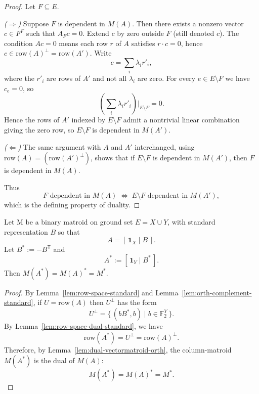 \begin{proof}
    Let $F \subseteq E$.  

    \emph{($\Rightarrow$)}  
    Suppose $F$ is dependent in $M(A)$.  
    Then there exists a nonzero vector $c \in F^{F}$ such that $A_F c = 0$.  
    Extend $c$ by zero outside $F$ (still denoted $c$).  
    The condition $A c = 0$ means each row $r$ of $A$ satisfies $r \cdot c = 0$,  
    hence $c \in \text{row}(A)^{\perp} = \text{row}(A')$.  
    Write
    \[
        c = \sum_i \lambda_i r'_i,
    \]
    where the $r'_i$ are rows of $A'$ and not all $\lambda_i$ are zero.  
    For every $e \in E\setminus F$ we have $c_e = 0$, so
    \[
        \left(\sum_i \lambda_i r'_i\right)\big|_{E\setminus F} = 0.
    \]
    Hence the rows of $A'$ indexed by $E \setminus F$ admit a nontrivial
    linear combination giving the zero row, so $E \setminus F$ is dependent in $M(A')$.

    \emph{($\Leftarrow$)}  
    The same argument with $A$ and $A'$ interchanged, using
    $\text{row}(A) = (\text{row}(A')^\perp)$, shows that if
    $E\setminus F$ is dependent in $M(A')$, then $F$ is dependent in $M(A)$.

    Thus
    \[
        F \text{ dependent in } M(A)
        \;\Longleftrightarrow\;
        E \setminus F \text{ dependent in } M(A'),
    \]
    which is the defining property of duality.
\end{proof}





\begin{theorem}
\label{thm:StandardRepr.toMatroid_dual}
Let M be a binary matroid on ground set $E = X \cup Y$, with
standard representation $B$ so that
\[A = [\, \mathbf{1}_X \mid B \,].\]
Let $B^{*} := -B^{\mathsf T}$ and
\[A^{*} := [\, \mathbf{1}_Y \mid B^{*} \,].\]
Then $M(A^{*}) = M(A)^{*} = M^{*}$.
\end{theorem}

\begin{proof}
    By Lemma~\ref{lem:row-space-standard} and Lemma~\ref{lem:orth-complement-standard},
    if $U = \text{row}(A)$ then $U^\perp$ has the form
    \[U^\perp = \{\, (b B^*, b) \mid b \in \mathbb{F}_2^Y \,\}.\]
    By Lemma~\ref{lem:row-space-dual-standard}, we have
    \[\text{row}(A^*) = U^\perp = \text{row}(A)^\perp.\]
    Therefore, by Lemma~\ref{lem:dual-vectormatroid-orth},
    the column-matroid $M(A^*)$ is the dual of $M(A)$:
    \[M(A^*) = M(A)^* = M^*.\]
\end{proof}

